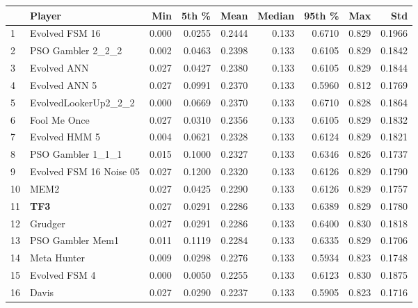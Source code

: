 \begin{tabular}{llrrrrrrr}
\toprule
{} &                   Player &    Min &   5th \% &    Mean &  Median &  95th \% &    Max &     Std \\
\midrule
1  &           Evolved FSM 16 &  0.000 &  0.0255 &  0.2444 &   0.133 &  0.6710 &  0.829 &  0.1966 \\
2  &        PSO Gambler 2\_2\_2 &  0.002 &  0.0463 &  0.2398 &   0.133 &  0.6105 &  0.829 &  0.1842 \\
3  &              Evolved ANN &  0.027 &  0.0427 &  0.2380 &   0.133 &  0.6105 &  0.829 &  0.1844 \\
4  &            Evolved ANN 5 &  0.027 &  0.0991 &  0.2370 &   0.133 &  0.5960 &  0.812 &  0.1769 \\
5  &     EvolvedLookerUp2\_2\_2 &  0.000 &  0.0669 &  0.2370 &   0.133 &  0.6710 &  0.828 &  0.1864 \\
6  &             Fool Me Once &  0.027 &  0.0310 &  0.2356 &   0.133 &  0.6105 &  0.829 &  0.1832 \\
7  &            Evolved HMM 5 &  0.004 &  0.0621 &  0.2328 &   0.133 &  0.6124 &  0.829 &  0.1821 \\
8  &        PSO Gambler 1\_1\_1 &  0.015 &  0.1000 &  0.2327 &   0.133 &  0.6346 &  0.826 &  0.1737 \\
9  &  Evolved FSM 16 Noise 05 &  0.027 &  0.1200 &  0.2320 &   0.133 &  0.6126 &  0.829 &  0.1790 \\
10 &                     MEM2 &  0.027 &  0.0425 &  0.2290 &   0.133 &  0.6126 &  0.829 &  0.1757 \\
11 &                      \textbf{TF3} &  0.027 &  0.0291 &  0.2286 &   0.133 &  0.6389 &  0.829 &  0.1780 \\
12 &                  Grudger &  0.027 &  0.0291 &  0.2286 &   0.133 &  0.6400 &  0.830 &  0.1818 \\
13 &         PSO Gambler Mem1 &  0.011 &  0.1119 &  0.2284 &   0.133 &  0.6335 &  0.829 &  0.1706 \\
14 &              Meta Hunter &  0.009 &  0.0298 &  0.2276 &   0.133 &  0.5934 &  0.823 &  0.1748 \\
15 &            Evolved FSM 4 &  0.000 &  0.0050 &  0.2255 &   0.133 &  0.6123 &  0.830 &  0.1875 \\
16 &                    Davis &  0.027 &  0.0290 &  0.2237 &   0.133 &  0.5905 &  0.823 &  0.1716 \\
\bottomrule
\end{tabular}
